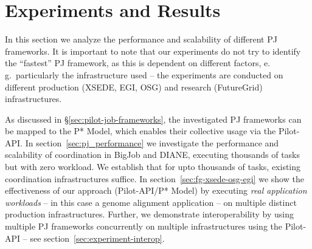 \documentclass{sig-alternate}
\begin{document}


\section{Experiments and Results}
\label{sec:exp_res}


In this section we analyze the performance and scalability of
different PJ frameworks.  It is important to note that our experiments
do not try to identify the ``fastest'' PJ framework, as
this is dependent on different factors, e.\,g.\ particularly the
infrastructure used -- the experiments are conducted on different
production (XSEDE, EGI, OSG) and research (FutureGrid) infrastructures. 

As discussed in \S\ref{sec:pilot-job-frameworks}, the investigated PJ
frameworks can be mapped to the P* Model, which enables their
collective usage via the Pilot-API. In
section~\ref{sec:pj_performance} we investigate the performance and
scalability of coordination in BigJob and DIANE, executing thousands
of tasks but with zero workload. We establish that for upto thousands
of tasks, existing coordination infrastructures suffice.  In
section~\ref{sec:fg-xsede-osg-egi} we show the effectiveness of our
approach (Pilot-API/P* Model) by executing {\it real application
  workloads} -- in this case a genome alignment application -- on
multiple distinct production infrastructures. Further, we demonstrate
interoperability by using multiple PJ frameworks concurrently on
multiple infrastructures using the Pilot-API -- see
section~\ref{sec:experiment-interop}.



\end{document}
